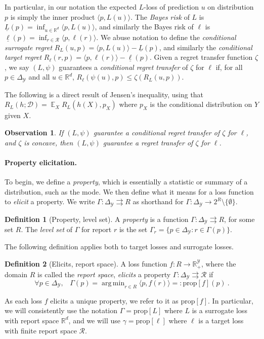 \documentclass{article}
\newtheorem{observation}{Observation}
\theoremstyle{definition}\newtheorem{definition}{Definition}
\theoremstyle{definition}\newtheorem{assumption}{Assumption}
\DeclareMathOperator*{\argmin}{arg\,min}
\newcommand{\reals}{\mathbb{R}}
\newcommand{\prop}[1]{\mathrm{prop}[#1]}
\newcommand{\simplex}{\Delta_\Y}
\newcommand{\D}{\mathcal{D}}
\DeclareMathOperator{\E}{\mathbb{E}}  %
\newcommand{\R}{\mathcal{R}}
\newcommand{\Y}{\mathcal{Y}}
\newcommand{\risk}[1]{\underline{#1}}
\newcommand{\inprod}[2]{\langle #1, #2 \rangle}%
\newcommand{\toto}{\rightrightarrows}
\begin{document}
In particular, in our notation the expected $L$-loss of prediction $u$ on distribution $p$ is simply the inner product $\inprod{p}{L(u)}$.
The \emph{Bayes risk} of $L$ is $\risk{L}(p) = \inf_{u \in \reals^d} \inprod{p}{L(u)}$, and similarly the Bayes risk of $\ell$ is $\risk{\ell}(p) = \inf_{r \in \R} \inprod{p}{\ell(r)}$.
We abuse notation to define the \emph{conditional surrogate regret} $R_L(u,p) = \inprod{p}{L(u)} - \risk{L}(p)$, and similarly the \emph{conditional target regret} $R_{\ell}(r,p) = \inprod{p}{\ell(r)} - \risk{\ell}(p)$.
Given a regret transfer function $\zeta$, we say $(L,\psi)$ guarantees a \emph{conditional regret transfer} of $\zeta$ for $\ell$ if, for all $p \in \simplex$ and all $u \in \reals^d$, $R_{\ell}(\psi(u),p) \leq \zeta(R_L(u,p))$.

The following is a direct result of Jensen's inequality, using that $R_L(h;\D) = \E_X R_L(h(X),p_X)$ where $p_X$ is the conditional distribution on $Y$ given $X$.
\begin{observation} \label{obs:transfer}
  If $(L,\psi)$ guarantee a conditional regret transfer of $\zeta$ for $\ell$, and $\zeta$ is concave, then $(L,\psi)$ guarantee a regret transfer of $\zeta$ for $\ell$.
\end{observation}
 
\paragraph{Property elicitation.}
To begin, we define a \emph{property}, which is essentially a statistic or summary of a distribution, such as the mode.
We then define what it means for a loss function to \emph{elicit} a property.
We write $\Gamma: \simplex \toto R$ as shorthand for $\Gamma: \simplex \to 2^{R} \setminus \{\emptyset\}$.

\begin{definition}[Property, level set]\label{def:property}
  A \emph{property} is a function $\Gamma:\simplex\toto R$, for some set $R$.
  The \emph{level set} of $\Gamma$ for report $r$ is the set $\Gamma_r = \{p \in \simplex : r \in \Gamma(p)\}$.
\end{definition}
The following definition applies both to target losses and surrogate losses.
\begin{definition}[Elicits, report space]
  \label{def:elicits}
  A loss function $f:R\to\reals^\Y_+$, where the domain $R$ is called the \emph{report space}, \emph{elicits} a property $\Gamma:\simplex \toto \R$ if
  \begin{equation}
    \forall p\in\simplex,\;\;\;\Gamma(p) = \argmin_{r \in R} \inprod{p}{f(r)} =: \prop{f}(p)~.
  \end{equation}
\end{definition}
As each loss $f$ elicits a unique property, we refer to it as $\prop{f}$.
In particular, we will consistently use the notation $\Gamma = \prop{L}$ where $L$ is a surrogate loss with report space $\reals^d$, and we will use $\gamma = \prop{\ell}$ where $\ell$ is a target loss with finite report space $\R$.
\end{document}
